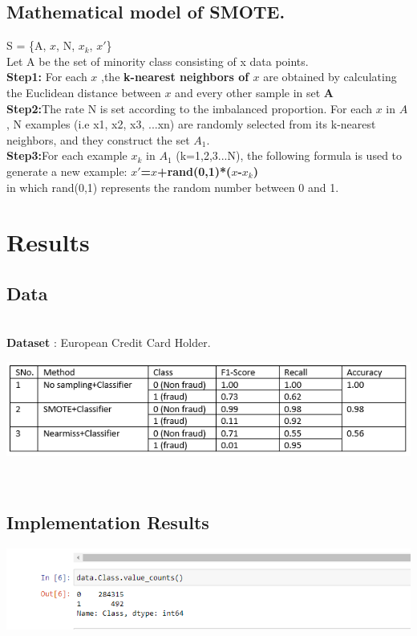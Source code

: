 \documentclass[a4paper, 12pt]{article}
\begin{document}
\subsection{Mathematical model of SMOTE.}
\par
S = \{A, $x$, N, $x_k$, $x'$\}\\
Let A be the set of minority class consisting of x data points.\\

\textbf{Step1:} For each $x$ ,the \textbf{k-nearest neighbors of $x$} are obtained by calculating the Euclidean distance between $x$ and every other sample in set \textbf{A}
\\


\textbf{Step2:}The rate N is set according to the imbalanced proportion. For each $x$ in $A$, N examples (i.e x1, x2, x3, ...xn) are randomly selected from its k-nearest neighbors, and they construct the set $A_1$.\\

\textbf{Step3:}For each example $x_k$ in $A_1$ (k=1,2,3...N), the following formula is used to generate a new example:
\textbf{$x'$=$x$+rand(0,1)*($x$-$x_k$)}\\ in which rand(0,1) represents the random number between 0 and 1.

			
		

\newpage
\section{Results}
\subsection{Data}
\\
\textbf{Dataset}  : European Credit Card Holder.\\
\par
\includegraphics[width=\linewidth]{./table1}

\par\\
\subsection{Implementation Results}
\includegraphics[width=1\linewidth]{./class}
\\\\
\hline
\end{document}
